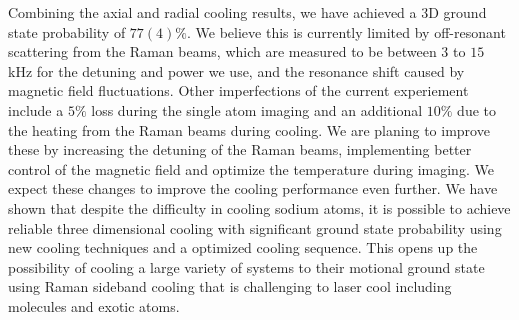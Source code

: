 \documentclass[aps,prl,twocolumn,groupedaddress]{revtex4-1}
\begin{document}
Combining the axial and radial cooling results,
we have achieved a 3D ground state probability of $77(4)\%$.
We believe this is currently limited by off-resonant scattering from the Raman beams,
which are measured to be between $3$ to $15$ kHz for the detuning and power we use,
and the resonance shift caused by magnetic field fluctuations.
Other imperfections of the current experiement include a $5\%$ loss during the single atom
imaging and an additional $10\%$ due to the heating from the Raman beams during cooling.
We are planing to improve these by increasing the detuning of the Raman beams,
implementing better control of the magnetic field and optimize the temperature during imaging.
We expect these changes to improve the cooling performance even further.
We have shown that despite the difficulty in cooling sodium atoms,
it is possible to achieve reliable three dimensional cooling with significant ground state
probability using new cooling techniques and a optimized cooling sequence.
This opens up the possibility of cooling a large variety of systems to their motional ground
state using Raman sideband cooling that is challenging to laser cool
including molecules and exotic atoms.



\end{document}
